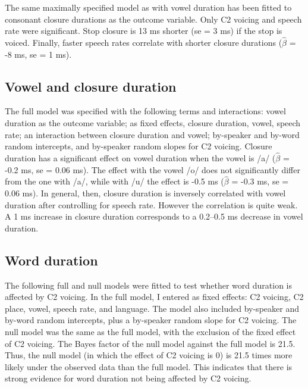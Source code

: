 \documentclass[preprint]{JASAnew}
\begin{document}
The same maximally specified model as with vowel duration has been
fitted to consonant closure durations as the outcome variable. Only C2
voicing and speech rate were significant. Stop closure is 13 ms shorter
(se = 3 ms) if the stop is voiced. Finally, faster speech rates
correlate with shorter closure durations (\(\hat{\beta}\) = -8 ms, se =
1 ms).

\hypertarget{vowel-and-closure-duration}{%
\subsection{Vowel and closure
duration}\label{vowel-and-closure-duration}}

The full model was specified with the following terms and interactions:
vowel duration as the outcome variable; as fixed effects, closure
duration, vowel, speech rate; an interaction between closure duration
and vowel; by-speaker and by-word random intercepts, and by-speaker
random slopes for C2 voicing. Closure duration has a significant effect
on vowel duration when the vowel is /a/ (\(\hat{\beta}\) = -0.2 ms, se =
0.06 ms). The effect with the vowel /o/ does not significantly differ
from the one with /a/, while with /u/ the effect is -0.5 ms
(\(\hat{\beta}\) = -0.3 ms, se = 0.06 ms). In general, then, closure
duration is inversely correlated with vowel duration after controlling
for speech rate. However the correlation is quite weak. A 1 ms increase
in closure duration corresponds to a 0.2--0.5 ms decrease in vowel
duration.

\hypertarget{word-duration}{%
\subsection{Word duration}\label{word-duration}}

The following full and null models were fitted to test whether word
duration is affected by C2 voicing. In the full model, I entered as
fixed effects: C2 voicing, C2 place, vowel, speech rate, and language.
The model also included by-speaker and by-word random intercepts, plus a
by-speaker random slope for C2 voicing. The null model was the same as
the full model, with the exclusion of the fixed effect of C2 voicing.
The Bayes factor of the null model against the full model is 21.5. Thus,
the null model (in which the effect of C2 voicing is 0) is 21.5 times
more likely under the observed data than the full model. This indicates
that there is strong evidence for word duration not being affected by C2
voicing.
\end{document}
